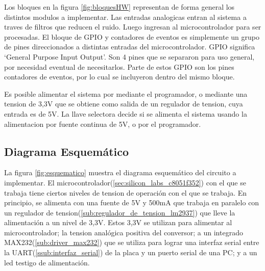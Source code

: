\documentclass{article}
\theoremstyle{definition}
\theoremstyle{remark}
\begin{document}
Los bloques en la figura \ref{fig:bloquesHW} representan de forma general los distintos modulos a implementar. Las entradas analogicas entran al sistema a traves de filtros que reducen el ruido. Luego ingresan al microcontrolador para ser procesadas. El bloque de GPIO y contadores de eventos es simplemente un grupo de pines direccionados a distintas entradas del microcontrolador. GPIO significa `General Purpose Input Output'. Son 4 pines que se separaron para uso general, por necesidad eventual de necesitarlos. Parte de estos GPIO son los pines contadores de eventos, por lo cual se incluyeron dentro del mismo bloque.

Es posible alimentar el sistema por mediante el programador, o mediante una tension de 3,3V que se obtiene como salida de un regulador de tension, cuya entrada es de 5V. La llave selectora decide si se alimenta el sistema usando la alimentacion por fuente continua de 5V, o por el programador.




\subsection{Diagrama Esquemático} %
\label{sub:diagrama_esquematico}

La figura \ref{fig:esquematico} muestra el diagrama esquemático del circuito a implementar. El microcontrolador(\ref{sec:silicon_labs_c8051f352}) con el que se trabaja tiene ciertos niveles de tension de operación con el que se trabaja. En principio, se alimenta con una fuente de 5V y 500mA que trabaja en paralelo con un regulador de tension(\ref{sub:regulador_de_tension_lm2937}) que lleve la alimentación a un nivel de 3,3V. Estos 3,3V se utilizan para alimentar al microcontrolador; la tension analógica positiva del conversor; a un integrado MAX232(\ref{sub:driver_max232}) que se utiliza para lograr una interfaz serial entre la UART(\ref{ssub:interfaz_serial}) de la placa y un puerto serial de una PC; y a un led testigo de alimentación.
\end{document}
